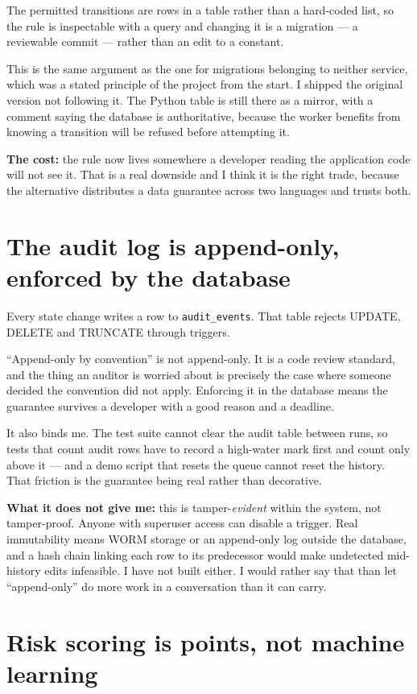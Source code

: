 \documentclass[11pt,a4paper]{article}
\begin{document}
The permitted transitions are rows in a table rather than a hard-coded list, so
the rule is inspectable with a query and changing it is a migration --- a
reviewable commit --- rather than an edit to a constant.

This is the same argument as the one for migrations belonging to neither
service, which was a stated principle of the project from the start. I shipped
the original version not following it. The Python table is still there as a
mirror, with a comment saying the database is authoritative, because the worker
benefits from knowing a transition will be refused before attempting it.

\textbf{The cost:} the rule now lives somewhere a developer reading the
application code will not see it. That is a real downside and I think it is the
right trade, because the alternative distributes a data guarantee across two
languages and trusts both.

\section{The audit log is append-only, enforced by the database}

Every state change writes a row to \texttt{audit\_events}. That table rejects
UPDATE, DELETE and TRUNCATE through triggers.

``Append-only by convention'' is not append-only. It is a code review standard,
and the thing an auditor is worried about is precisely the case where someone
decided the convention did not apply. Enforcing it in the database means the
guarantee survives a developer with a good reason and a deadline.

It also binds me. The test suite cannot clear the audit table between runs, so
tests that count audit rows have to record a high-water mark first and count
only above it --- and a demo script that resets the queue cannot reset the
history. That friction is the guarantee being real rather than decorative.

\textbf{What it does not give me:} this is tamper-\emph{evident} within the
system, not tamper-proof. Anyone with superuser access can disable a trigger.
Real immutability means WORM storage or an append-only log outside the database,
and a hash chain linking each row to its predecessor would make undetected
mid-history edits infeasible. I have not built either. I would rather say that
than let ``append-only'' do more work in a conversation than it can carry.

\section{Risk scoring is points, not machine learning}
\end{document}
